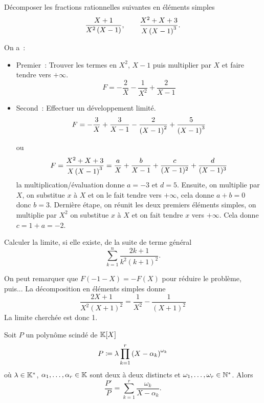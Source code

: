 \documentclass{magnolia}
\begin{document}
\begin{exos}
\exo Décomposer les fractions rationnelles suivantes en éléments simples
  \[\frac{X+1}{X^2\left(X-1\right)}, \qquad \frac{X^2+X+3}{X\left(X-1\right)^3}.\]
  \begin{sol}
  On a~:
  \begin{itemize}
  \item Premier~: Trouver les termes en $X^2$, $X-1$ puis multiplier par $X$ et
    faire tendre vers $+\infty$.
    \[F=-\frac{2}{X}-\frac{1}{X^2}+\frac{2}{X-1}\]
  \item Second~: Effectuer un développement limité.
    \[F=-\frac{3}{X}+\frac{3}{X-1}-\frac{2}{\left(X-1\right)^2}+\frac{5}{\left(X-1\right)^3}\]
    
    ou 
    $$F=\frac{X^2+X+3}{X\left(X-1\right)^3}=\frac{a}{X}+\frac{b}{X-1}+\frac{c}{(X-1)^2}+\frac{d}{(X-1)^3}$$ la multiplication/évaluation donne $a=-3$ et $d=5$. Ensuite, on multiplie par $X$, on substitue $x$ à $X$ et on le fait tendre vers $+\infty$, cela donne $a+b=0$ donc $b=3$. Dernière étape, on réunit les deux premiers éléments simples, on multiplie par $X^2$ on substitue $x$ à $X$ et on fait tendre $x$ vers $+\infty$. Cela donne $c=1+a=-2$. 
  \end{itemize}
  \end{sol}
\exo Calculer la limite, si elle existe, de la suite de terme général
  \[\sum_{k=1}^n \frac{2k+1}{k^2(k+1)^2}.\]
  \begin{sol}
  On peut remarquer que $F(-1-X)=-F(X)$ pour réduire le problème, puis... 
  La décomposition en éléments simples donne
  \[\frac{2X+1}{X^2(X+1)^2}=\frac{1}{X^2}-\frac{1}{(X+1)^2}\]
  La limite cherchée est donc 1.
  \end{sol}
\end{exos}

\begin{proposition}
Soit $P$ un polynôme scindé de $\polyK$
  \[P\coloneqq\lambda\prod_{k=1}^r \left(X-\alpha_k\right)^{\omega_k}\]
  où $\lambda\in\mathbb{K}^*$, $\alpha_1,\ldots,\alpha_r\in\mathbb{K}$ sont deux à deux distincts et
  $\omega_1,\ldots,\omega_r\in{\mathbb{N}^*}$. Alors
  \[\frac{P'}{P}=\sum_{k=1}^r \frac{\omega_k}{X-\alpha_k}.\] 
\end{proposition}


\end{document}
